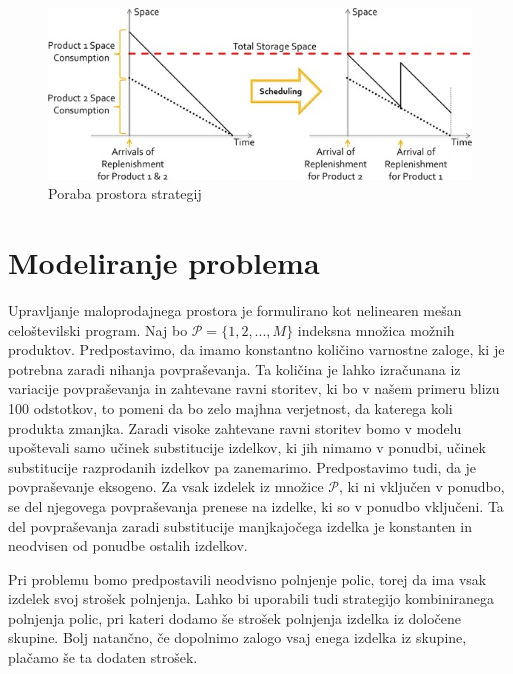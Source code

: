 \documentclass[a4paper]{article}
\begin{document}
\begin{figure}[ht]
\includegraphics [scale = 0.8]{primerjava-strategij}
\caption{Poraba prostora strategij}
\end{figure}



\section{Modeliranje problema}

Upravljanje maloprodajnega prostora je formulirano kot nelinearen mešan celoštevilski program. Naj bo $\mathcal{P}= \{1, 2, ..., M\}$ indeksna množica možnih produktov. Predpostavimo, da imamo konstantno količino varnostne zaloge, ki je potrebna zaradi nihanja povpraševanja. Ta količina je lahko izračunana iz variacije povpraševanja in zahtevane ravni storitev, ki bo v našem primeru blizu 100 odstotkov, to pomeni da bo zelo majhna verjetnost, da katerega koli produkta zmanjka. Zaradi visoke zahtevane ravni storitev bomo v modelu upoštevali samo učinek substitucije izdelkov, ki jih nimamo v ponudbi, učinek substitucije razprodanih izdelkov pa zanemarimo. Predpostavimo tudi, da je povpraševanje eksogeno. Za vsak izdelek iz množice  $\mathcal{P}$, ki ni vključen v ponudbo, se del njegovega povpraševanja prenese na izdelke, ki so v ponudbo vključeni. Ta del povpraševanja zaradi substitucije manjkajočega izdelka je konstanten in neodvisen od ponudbe ostalih izdelkov. 

Pri problemu bomo predpostavili neodvisno polnjenje polic, torej da  ima vsak izdelek svoj strošek polnjenja. Lahko bi uporabili tudi strategijo kombiniranega polnjenja polic, pri kateri dodamo še strošek polnjenja izdelka iz določene skupine. Bolj natančno, če dopolnimo zalogo vsaj enega izdelka iz skupine, plačamo še ta dodaten strošek.
\end{document}
